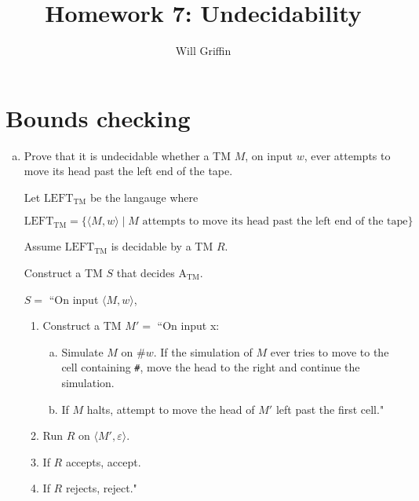 \documentclass{article}
\title{Homework 7: Undecidability}
\author{Will Griffin}
\begin{document}
    \maketitle

    \section{Bounds checking}

    \begin{enumerate}[(a)]
        \item Prove that it is undecidable whether a TM $M$, on input $w$, ever attempts to move its head past the left end of the tape.

            Let $\text{LEFT}_\text{TM}$ be the langauge where 

            \begin{equation*}
            \text{LEFT}_\text{TM} = \{ \langle M, w \rangle \mid M \text { attempts to move its head past the left end of the tape}\}
            \end{equation*}

            Assume $\text{LEFT}_\text{TM}$ is decidable by a TM $R$.

            Construct a TM $S$ that decides $\text{A}_\text{TM}$.

            $S = $ ``On input $\langle M, w \rangle$,
            \begin{enumerate}[1.]
                \item Construct a TM $M' = $ ``On input x:
                    \begin{enumerate}[a.]
                        \item Simulate $M$ on $\texttt{\#}w$. If the simulation of $M$ ever tries to move to the cell containing \texttt{\#}, move the head to the right and continue the simulation.

                        \item If $M$ halts, attempt to move the head of $M'$ left past the first cell."
                    \end{enumerate}

                \item Run $R$ on $\langle M', \varepsilon \rangle$.

                \item If $R$ accepts, accept.

                \item If $R$ rejects, reject."
            \end{enumerate}


\end{enumerate}
\end{document}
